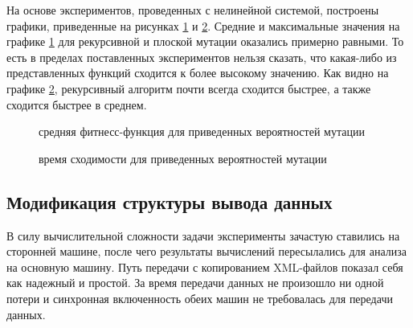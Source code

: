 \documentclass[utf8,usehyperref,14pt]{G7-32}
\begin{document}
На основе экспериментов, проведенных с нелинейной системой, построены графики, приведенные на рисунках \ref{mutate_diff_fit_nl} и \ref{mutate_diff_gen_nl}. Средние и максимальные значения на графике \ref{mutate_diff_fit_nl} для рекурсивной и плоской мутации оказались примерно равными. То есть в пределах поставленных экспериментов нельзя сказать, что какая-либо из представленных функций сходится к более высокому значению. Как видно на графике \ref{mutate_diff_gen_nl}, рекурсивный алгоритм почти всегда сходится быстрее, а также сходится быстрее в среднем.
\begin{figure}[H]
 
  \caption{средняя фитнесс-функция для приведенных вероятностей мутации}\label{mutate_diff_fit_nl}
\end{figure}
\begin{figure}[H]
 
  \caption{время сходимости для приведенных вероятностей мутации}\label{mutate_diff_gen_nl}
\end{figure}


\subsection{Модификация структуры вывода данных}
В силу вычислительной сложности задачи эксперименты зачастую ставились на сторонней машине, после чего результаты вычислений пересылались для анализа на основную машину. Путь передачи с копированием XML-файлов показал себя как надежный и простой. За время передачи данных не произошло ни одной потери и синхронная включенность обеих машин не требовалась для передачи данных.
\end{document}
